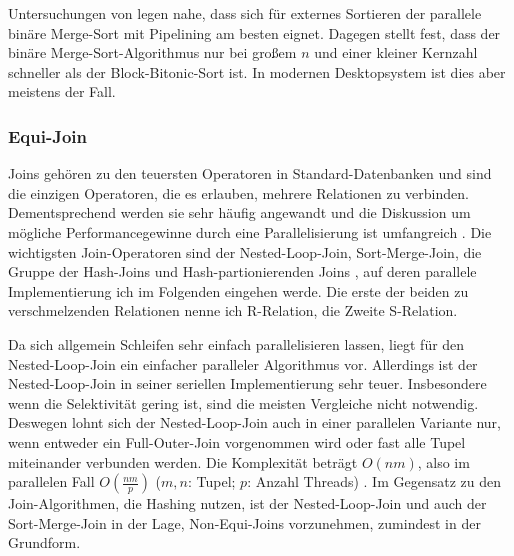 \documentclass[a4paper,12pt,twoside]{article}
\begin{document}
Untersuchungen von {\textcite{Bitton1984}} legen nahe, dass sich für externes Sortieren der parallele binäre Merge-Sort mit Pipelining am besten eignet. Dagegen stellt {\textcite{Menon1986}} fest, dass der binäre Merge-Sort-Algorithmus nur bei großem $n$ und einer kleiner Kernzahl schneller als der Block-Bitonic-Sort ist. In modernen Desktopsystem ist dies aber meistens der Fall.

\subsubsection{Equi-Join}
\label{Equi Join} 

Joins gehören zu den teuersten Operatoren in Standard-Datenbanken und sind die einzigen Operatoren, die es erlauben, mehrere Relationen zu verbinden. Dementsprechend werden sie sehr häufig angewandt und die Diskussion um mögliche Performancegewinne durch eine Parallelisierung ist umfangreich \parencite{Richardson1987, Valduriez1984, Schneider1989, DeWitt1985, Lu1994}. Die wichtigsten Join-Operatoren sind der Nested-Loop-Join, Sort-Merge-Join, die Gruppe der Hash-Joins und Hash-partionierenden Joins \parencite{Mishra1992, Lu1994}, auf deren parallele Implementierung ich im Folgenden eingehen werde. Die erste der beiden zu verschmelzenden Relationen nenne ich R-Relation, die Zweite S-Relation.

Da sich allgemein Schleifen sehr einfach parallelisieren lassen, liegt für den Nested-Loop-Join ein einfacher paralleler Algorithmus vor. Allerdings ist der Nested-Loop-Join in seiner seriellen Implementierung sehr teuer. Insbesondere wenn die Selektivität gering ist, sind die meisten Vergleiche nicht notwendig. Deswegen lohnt sich der Nested-Loop-Join auch in einer parallelen Variante nur, wenn entweder ein Full-Outer-Join vorgenommen wird oder fast alle Tupel miteinander verbunden werden. Die Komplexität beträgt $ O(n m) $, also im parallelen Fall $ O( \frac {n m} {p} )$ ($m,n$: Tupel; $p$: Anzahl Threads) \parencite[S. 72]{Mishra1992}. Im Gegensatz zu den Join-Algorithmen, die Hashing nutzen, ist der Nested-Loop-Join und auch der Sort-Merge-Join in der Lage, Non-Equi-Joins vorzunehmen, zumindest in der Grundform. 
\end{document}
